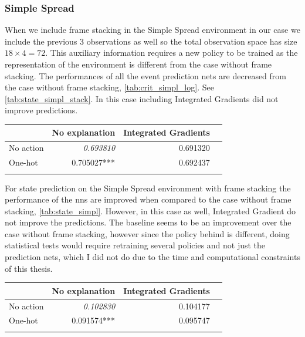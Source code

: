 \documentclass[UKenglish]{uiomasterthesis}
\begin{document}
\subsubsection{Simple Spread}
\label{sec:simpl_exp3}
When we include frame stacking in the Simple Spread environment in our case we include the previous 3 observations as well so the total observation space has size $18\times 4 = 72$. This auxiliary information requires a new policy to be trained as the representation of the environment is different from the case without frame stacking. The performances of all the event prediction nets are decreased from the case without frame stacking, \cref{tab:crit_simpl_log}. See \cref{tab:state_simpl_stack}. In this case including Integrated Gradients did not improve predictions.

\begin{center}
\label{tab:state_simpl_stack}
\begin{tabular}{lrrr}
\toprule
 & No explanation & Integrated Gradients \\
\midrule
    No action & \textit{0.693810} & 0.691320 \\
One-hot & 0.705027*** & 0.692437 \\
\bottomrule
\addlinespace[2pt]
\multicolumn{3}{l}{\textsuperscript{***}$p<0.001$, 
  \textsuperscript{**}$p<0.01$, 
  \textsuperscript{*}$p<0.05$}
\end{tabular}
\end{center}

For state prediction on the Simple Spread environment with frame stacking the performance of the \acp{nn} are improved when compared to the case without frame stacking, \ref{tab:state_simpl}. However, in this case as well, Integrated Gradient do not improve the predictions. The baseline seems to be an improvement over the case without frame stacking, however since the policy behind is different, doing statistical tests would require retraining several policies and not just the prediction nets, which I did not do due to the time and computational constraints of this thesis.

\begin{center}
\label{tab:event_simpl_stack}
\begin{tabular}{lrrr}
\toprule
 & No explanation & Integrated Gradients \\
\midrule
    No action & \textit{0.102830} & 0.104177 \\
One-hot & 0.091574*** & 0.095747 \\
\bottomrule
\addlinespace[2pt]
\multicolumn{3}{l}{\textsuperscript{***}$p<0.001$, 
  \textsuperscript{**}$p<0.01$, 
  \textsuperscript{*}$p<0.05$}
\end{tabular}
\end{center}
\end{document}
